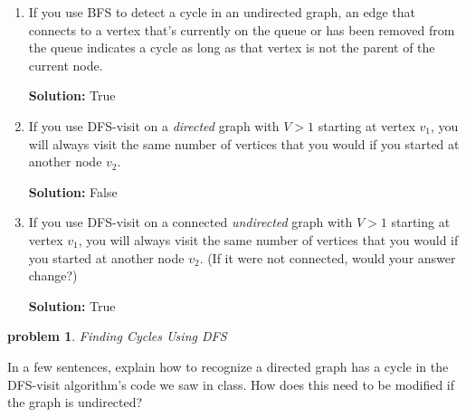 \documentclass[10pt]{article}
\newcommand{\solution}[1]{\color{blue}\hfill\break\noindent\textbf{Solution:} #1\color{black}}
\newtheorem{problem}{\sc\color{cit}problem}
\begin{document}
\begin{enumerate}
\renewcommand{\theenumi}{\Alph{enumi}}

    \item If you use BFS to detect a cycle in an undirected graph, an edge that connects to a vertex that's currently on the queue or has been removed from the queue indicates a cycle as long as that vertex is not the parent of the current node.

    \solution{
    True
    }
    
    \item If you use DFS-visit on a \textit{directed} graph with $V>1$ starting at vertex $v_1$, you will always visit the same number of vertices that you would if you started at another node $v_2$.
    
    \solution{
    False
    }
    
    \item If you use DFS-visit on a connected \textit{undirected} graph with $V>1$ starting at vertex $v_1$, you will always visit the same number of vertices that you would if you started at another node $v_2$. (If it were not connected, would your answer change?)
    
    \solution{
    True
    }

\end{enumerate}


\begin{problem} Finding Cycles Using DFS  \end{problem}

In a few sentences, explain how to recognize a directed graph has a cycle in the DFS-visit algorithm's code we saw in class. How does this need to be modified if the graph is undirected?
\end{document}
